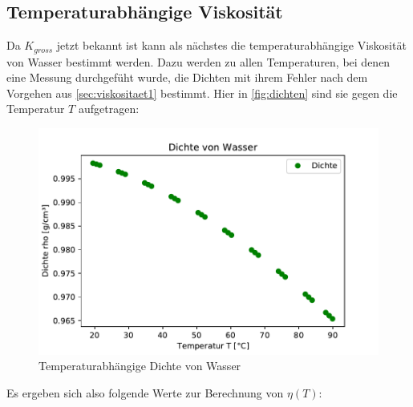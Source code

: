 \subsection{Temperaturabhängige Viskosität}
\label{sec:viskositaet}
Da $K_{gross}$ jetzt bekannt ist kann als nächstes die temperaturabhängige Viskosität von Wasser bestimmt werden.
Dazu werden zu allen Temperaturen, bei denen eine Messung durchgefüht wurde, die Dichten mit ihrem Fehler nach dem
Vorgehen aus \autoref{sec:viskositaet1} bestimmt. Hier in \autoref{fig:dichten} sind sie gegen die Temperatur $T$ aufgetragen:
\begin{figure}
    \centering
    \includegraphics{dichten.pdf} %
    \caption{Temperaturabhängige Dichte von Wasser} %
    \label{fig:dichten}
  \end{figure}
  Es ergeben sich also folgende Werte zur Berechnung von $\eta(T)$:
